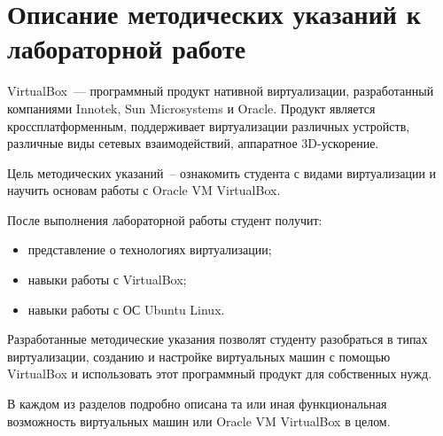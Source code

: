 \documentclass[a4paper, 14pt]{extreport}
\begin{document}
    \chapter{Описание методических указаний к лабораторной работе}
    VirtualBox~--- программный продукт нативной виртуализации, разработанный
    компаниями Innotek, Sun Microsystems и Oracle. Продукт является
    кроссплатформенным, поддерживает виртуализации различных устройств,
    различные виды сетевых взаимодействий, аппаратное 3D-ускорение.

    Цель методических указаний~-- ознакомить студента с видами виртуализации
    и научить основам работы с Oracle VM VirtualBox.

    После выполнения лабораторной работы студент получит:
    \begin{itemize}
        \item представление о технологиях виртуализации;
        \item навыки работы с VirtualBox;
        \item навыки работы с ОС Ubuntu Linux.
    \end{itemize}
    
    Разработанные методические указания позволят студенту разобраться в
    типах виртуализации, созданию и настройке виртуальных машин с помощью
    VirtualBox и использовать этот программный продукт для собственных нужд.

    В каждом из разделов подробно описана та или иная функциональная
    возможность виртуальных машин или Oracle VM VirtualBox в целом.
\end{document}
